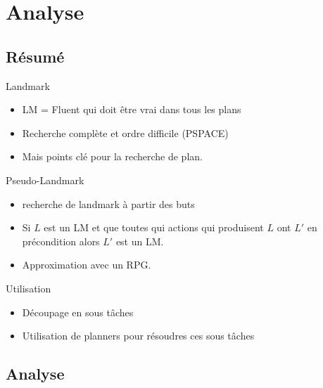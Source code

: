 \section{Analyse}
  \subsection*{Résumé}

\begin{frame}
  \begin{block}{Landmark}
    \begin{itemize}
      \item LM = Fluent qui doit être vrai dans tous les plans
      \item Recherche complète et ordre difficile (PSPACE)
      \item Mais points clé pour la recherche de plan.
    \end{itemize}
  \end{block}

  \begin{block}{Pseudo-Landmark}
    \begin{itemize}
      \item recherche de landmark à partir des buts
      \item Si $L$ est un LM et que toutes qui actions qui produisent $L$ ont $L'$ en précondition alors $L'$ est un LM.
      \item Approximation avec un RPG.
    \end{itemize}
  \end{block}
\end{frame}

\begin{frame}
  \begin{block}{Utilisation}
    \begin{itemize}
      \item Découpage en sous tâches
      \item Utilisation de planners pour résoudres ces sous tâches
    \end{itemize}
  \end{block}
\end{frame}

  \subsection*{Analyse}

